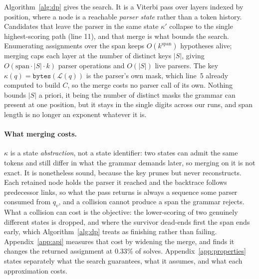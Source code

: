 \documentclass{article}
\begin{document}
Algorithm~\ref{alg:dp} gives the search. It is a Viterbi pass over layers
indexed by position, where a node is a reachable \emph{parser state} rather than
a token history. Candidates that leave the parser in the same state $\kappa'$
collapse to the single highest-scoring path (line 11), and that merge is what
bounds the search. Enumerating assignments over the span keeps
$O(k^{\text{span}})$ hypotheses alive; merging caps each layer at the number of
distinct keys $|S|$, giving $O(\text{span}\cdot|S|\cdot k)$ parser
operations and $O(|S|)$ live parsers. The key
$\kappa(q)=\texttt{bytes}(\mathcal{L}(q))$ is the parser's own mask, which
line~5 already computed to build $C$, so the merge costs no parser call of its
own. Nothing bounds $|S|$ a priori, it being the number of distinct masks the grammar
can present at one position, but it stays in the single digits across our runs,
and span length is no longer an exponent whatever it is.

\paragraph{What merging costs.}
$\kappa$ is a state \emph{abstraction}, not a state identifier: two states can
admit the same tokens and still differ in what the grammar demands later, so
merging on it is not exact. It is nonetheless sound, because the key prunes but
never reconstructs. Each retained node holds the parser it reached and the
backtrace follows predecessor links, so what the pass returns is always a
sequence some parser consumed from $q_v$, and a collision cannot produce a span
the grammar rejects. What a collision can cost is the objective: the
lower-scoring of two genuinely different states is dropped, and where the
survivor dead-ends first the span ends early, which Algorithm~\ref{alg:dp}
treats as finishing rather than failing.
Appendix~\ref{app:api} measures that cost by widening the merge, and finds it
changes the returned assignment at $0.33\%$ of solves.
Appendix~\ref{app:properties} states separately what the search guarantees, what
it assumes, and what each approximation costs.
\end{document}
